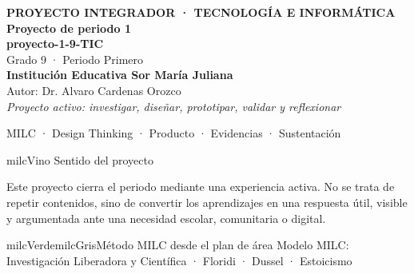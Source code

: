 \documentclass[11pt,letterpaper]{article}
\begin{document}
\thispagestyle{empty}

\vspace*{.85cm}
\begin{tcolorbox}[
  enhanced,colback=milcVino,colframe=milcVino,arc=12mm,width=.86\textwidth,
  boxrule=0pt,left=12mm,right=12mm,top=11mm,bottom=11mm,center,
  overlay={\draw[milcMagenta,line width=2pt,dash pattern=on 9pt off 8pt,rounded corners=10mm]
  ([xshift=7mm,yshift=-7mm]frame.north west) rectangle ([xshift=-7mm,yshift=7mm]frame.south east);}]
  \centering
  {\sffamily\bfseries\color{white}\fontsize{15}{17}\selectfont PROYECTO INTEGRADOR · TECNOLOGÍA E INFORMÁTICA}\\[1.0cm]
  {\sffamily\bfseries\color{white}\fontsize{30}{33}\selectfont Proyecto de periodo 1}\\[3mm]
  {\sffamily\bfseries\color{milcMostaza}\fontsize{25}{28}\selectfont proyecto-1-9-TIC}\\[8mm]
  {\sffamily\color{white}\Large Grado 9 · Periodo Primero}\\[1.0cm]
  {\sffamily\bfseries\color{white}\large Institución Educativa Sor María Juliana}\\[2mm]
  {\sffamily\color{white}Autor: Dr. Alvaro Cardenas Orozco}\\[4mm]
  {\sffamily\itshape\color{white}Proyecto activo: investigar, diseñar, prototipar, validar y reflexionar}
\end{tcolorbox}
\vfill
\begin{tcolorbox}[enhanced,colback=milcVino!72!black,colframe=milcVino!72!black,arc=5mm,boxrule=0pt,width=.86\textwidth,left=6mm,right=6mm,top=4mm,bottom=4mm,center]
{\color{white}\sffamily\small MILC · Design Thinking · Producto · Evidencias · Sustentación}
\end{tcolorbox}

\newpage
\begin{titlebox}{milcVino}
Sentido del proyecto
\end{titlebox}
\begin{multicols}{2}
Este proyecto cierra el periodo mediante una experiencia activa. No se trata de repetir contenidos, sino de convertir los aprendizajes en una respuesta útil, visible y argumentada ante una necesidad escolar, comunitaria o digital.

\columnbreak
\begin{softbox}{milcVerde}{milcGris}{Método MILC desde el plan de área}
Modelo MILC: Investigación Liberadora y Científica · Floridi · Dussel · Estoicismo
\end{softbox}
\end{multicols}
\end{document}
